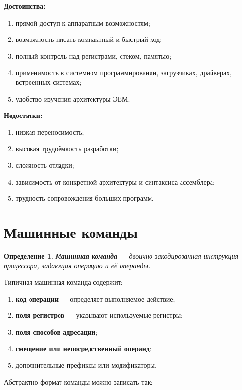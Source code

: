 \documentclass[12pt,a4paper]{article}
\newtheorem{definition}{Определение}
\begin{document}
\textbf{Достоинства:}

\begin{enumerate}
    \item прямой доступ к аппаратным возможностям;
    \item возможность писать компактный и быстрый код;
    \item полный контроль над регистрами, стеком, памятью;
    \item применимость в системном программировании, загрузчиках, драйверах, встроенных системах;
    \item удобство изучения архитектуры ЭВМ.
\end{enumerate}

\textbf{Недостатки:}

\begin{enumerate}
    \item низкая переносимость;
    \item высокая трудоёмкость разработки;
    \item сложность отладки;
    \item зависимость от конкретной архитектуры и синтаксиса ассемблера;
    \item трудность сопровождения больших программ.
\end{enumerate}

\section{Машинные команды}

\begin{definition}
\textbf{Машинная команда} --- двоично закодированная инструкция процессора, задающая операцию и её операнды.
\end{definition}

Типичная машинная команда содержит:

\begin{enumerate}
    \item \textbf{код операции} --- определяет выполняемое действие;
    \item \textbf{поля регистров} --- указывают используемые регистры;
    \item \textbf{поля способов адресации};
    \item \textbf{смещение или непосредственный операнд};
    \item дополнительные префиксы или модификаторы.
\end{enumerate}

Абстрактно формат команды можно записать так:
\end{document}
